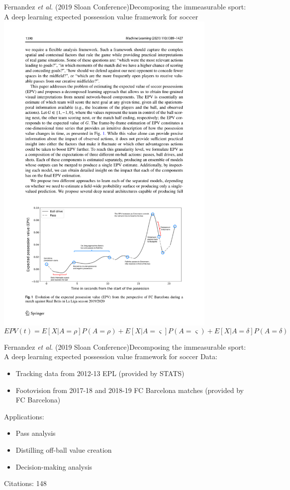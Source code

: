 \documentclass{beamer}
\begin{document}
  \begin{frame}{Fernandez {\it et al.} (2019 Sloan Conference)}{Decomposing the immeasurable sport:\\ A deep learning expected possession value framework for soccer}
    \centering
    \includegraphics[width = 0.8\textwidth]{images/fernandez_etal_2021.pdf}
    \small
    $$
      EPV(t) = E[X | A = \rho] P(A = \rho) + E[X | A = \varsigma] P(A = \varsigma) + E[X | A = \delta] P(A = \delta)
    $$
  \end{frame}

  \begin{frame}{Fernandez {\it et al.} (2019 Sloan Conference)}{Decomposing the immeasurable sport:\\ A deep learning expected possession value framework for soccer}
    Data:
    \begin{itemize}
      \item Tracking data from 2012-13 EPL (provided by STATS)
      \item Footovision from 2017-18 and 2018-19 FC Barcelona matches (provided by FC Barcelona)
    \end{itemize}
    Applications:
    \begin{itemize}
      \item Pass analysis
      \item Distilling off-ball value creation
      \item Decision-making analysis
    \end{itemize}
    Citations: 148
  \end{frame}
\end{document}
